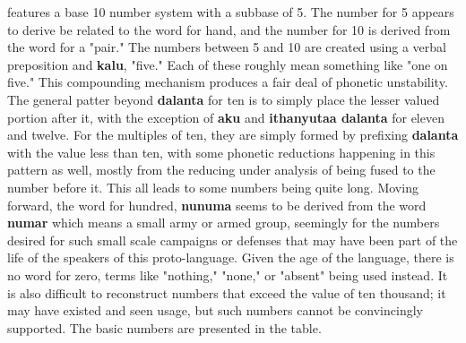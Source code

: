   \langname features a base 10 number system with a subbase of 5. The number for 5 appears to derive be related to the word for hand, and the number for 10 is derived from the word for a "pair." The numbers between 5 and 10 are created using a verbal preposition and \textbf{kalu}, "five." Each of these roughly mean something like "one on five." This compounding mechanism produces a fair deal of phonetic unstability. The general patter beyond \textbf{dalanta} for ten is to simply place the lesser valued portion after it, with the exception of \textbf{aku\tenbase} and \textbf{ithanyutaa dalanta} for eleven and twelve. For the multiples of ten, they are simply formed by prefixing \textbf{dalanta} with the value less than ten, with some phonetic reductions happening in this pattern as well, mostly from the  reducing under analysis of being fused to the number before it. This all leads to some numbers being quite long. Moving forward, the word for hundred, \textbf{nunuma} seems to be derived from the word \textbf{numar} which means a small army or armed group, seemingly for the numbers desired for such small scale campaigns or defenses that may have been part of the life of the speakers of this proto-language. Given the age of the language, there is no word for zero, terms like "nothing," "none," or "absent" being used instead. It is also difficult to reconstruct numbers that exceed the value of ten thousand; it may have existed and seen usage, but such numbers cannot be convincingly supported. The basic numbers are presented in the table.
  
